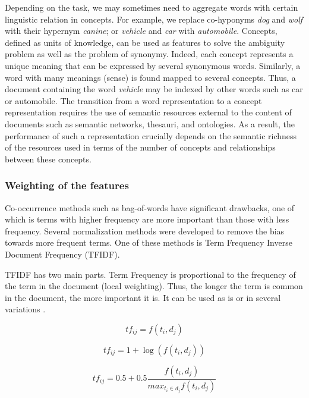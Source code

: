 
Depending on the task, we may sometimes need to aggregate words with certain linguistic relation in concepts. For example, we replace co-hyponyms \emph{dog} and \emph{wolf} with their hypernym \emph{canine}; or \emph{vehicle} and \emph{car} with \emph{automobile}. Concepts, defined as units of knowledge, can be used as features to solve the ambiguity problem as well as the problem of synonymy. Indeed, each concept represents a unique meaning that can be expressed by several synonymous words. Similarly, a word with many meanings (sense) is found mapped to several concepts. Thus, a document containing the word \emph{vehicle} may be indexed by other words such as car or automobile. The transition from a word representation to a concept representation requires the use of semantic resources external to the content of documents such as semantic networks, thesauri, and ontologies. As a result, the performance of such a representation crucially depends on the semantic richness of the resources used in terms of the number of concepts and relationships between these concepts.

\subsubsection{Weighting of the features}

Co-occurrence methods such as bag-of-words have significant drawbacks, one of which is terms with higher frequency are more important than those with less frequency. Several normalization methods were developed to remove the bias towards more frequent terms. One of these methods is Term Frequency Inverse Document Frequency (TFIDF).

TFIDF has two main parts. Term Frequency is proportional to the frequency of the term in the document (local weighting). Thus, the longer the term is common in the document, the more important it is. It can be used as is or in several variations \citep{singhal1997learning} \citep{sable2001using}.

$$t f _ { i j } = f \left( t _ { i } , d _ { j } \right)$$

$$t f _ { i j } = 1 + \log \left( f \left( t _ { i } , d _ { j } \right) \right)$$

$$ t f _ { i j } = 0.5 + 0.5 \frac { f \left( t _ { i } , d _ { j } \right) } { m a x _ { t _ { i } \in d _ { j } } f \left( t _ { i } , d _ { j } \right) }$$

